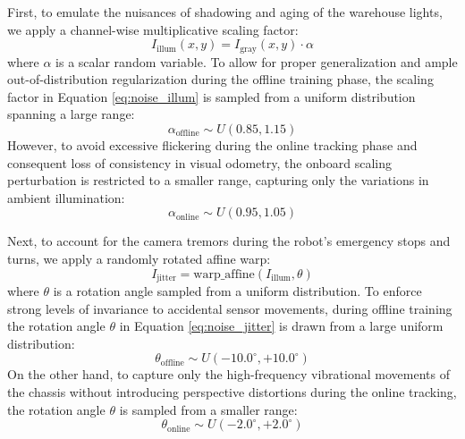 First, to emulate the nuisances of shadowing and aging of the warehouse lights, we apply a channel-wise multiplicative scaling factor:
\begin{equation} 
I_{\text{illum}}(x,y) = I_{\text{gray}}(x,y) \cdot \alpha \label{eq:noise_illum}
\end{equation}
where $\alpha$ is a scalar random variable. To allow for proper generalization and ample out-of-distribution regularization during the offline training phase, the scaling factor in Equation \ref{eq:noise_illum} is sampled from a uniform distribution spanning a large range:
\begin{equation} 
\alpha_{\text{offline}} \sim U(0.85, 1.15) \label{eq:noise_alpha_offline} 
\end{equation}
However, to avoid excessive flickering during the online tracking phase and consequent loss of consistency in visual odometry, the onboard scaling perturbation is restricted to a smaller range, capturing only the variations in ambient illumination:
\begin{equation} 
\alpha_{\text{online}} \sim U(0.95, 1.05) \label{eq:noise_alpha_online} 
\end{equation}

Next, to account for the camera tremors during the robot's emergency stops and turns, we apply a randomly rotated affine warp:
\begin{equation} 
I_{\text{jitter}} = \text{warp\_affine}(I_{\text{illum}}, \theta) \label{eq:noise_jitter} 
\end{equation}
where $\theta$ is a rotation angle sampled from a uniform distribution. To enforce strong levels of invariance to accidental sensor movements, during offline training the rotation angle $\theta$ in Equation \ref{eq:noise_jitter} is drawn from a large uniform distribution:
\begin{equation} 
\theta_{\text{offline}} \sim U(-10.0^\circ, +10.0^\circ) \label{eq:noise_theta_offline} 
\end{equation}
On the other hand, to capture only the high-frequency vibrational movements of the chassis without introducing perspective distortions during the online tracking, the rotation angle $\theta$ is sampled from a smaller range:
\begin{equation} 
\theta_{\text{online}} \sim U(-2.0^\circ, +2.0^\circ) \label{eq:noise_theta_online} 
\end{equation}

